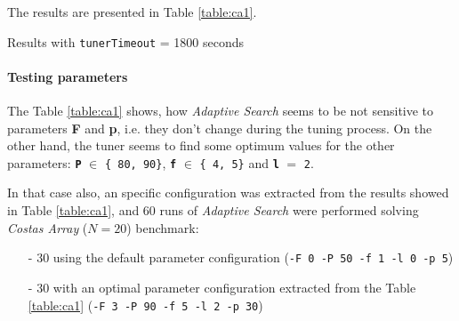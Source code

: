The results are presented in Table \ref{table:ca1}.

\begin{table} 
\caption{Results with \texttt{tunerTimeout} = 1800 seconds}
\centering 
\renewcommand{\arraystretch}{1.2}
\label{table:ca1}
\end{table}

\paragraph{ Testing parameters}

The Table \ref{table:ca1} shows, how {\it Adaptive Search} seems to be not sensitive to parameters {\bf F} and {\bf p}, i.e. they don't change during the tuning process. On the other hand, the tuner seems to find some optimum values for the other parameters: \texttt{\bf P} $\in$ \texttt{\{ 80, 90\}}, \texttt{\bf f} $\in$ \texttt{\{ 4, 5\}} and \texttt{\bf l} $=$ \texttt{2}.

In that case also, an specific configuration was extracted from the results showed in Table \ref{table:ca1}, and 60 runs of {\it Adaptive Search} were performed solving {\it Costas Array} ($N = 20$) benchmark: 
\begin{itemize}
	\item[-] 30 using the default parameter configuration (\texttt{-F 0 -P 50 -f 1 -l 0 -p 5})
	\item[-] 30 with an optimal parameter configuration extracted from the Table \ref{table:ca1} (\texttt{-F 3 -P 90 -f 5 -l 2 -p 30}) 
\end{itemize}

